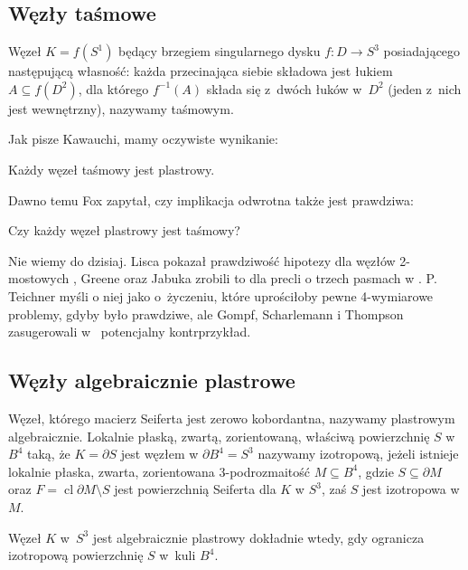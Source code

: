\subsection{Węzły taśmowe}
\begin{definition}
    Węzeł $K = f(S^1)$ będący brzegiem singularnego dysku $f \colon D \to S^3$ posiadającego następującą własność: każda przecinająca siebie składowa jest łukiem $A \subseteq f(D^2)$, dla którego $f^{-1}(A)$ składa się z~dwóch łuków w~$D^2$ (jeden z~nich jest wewnętrzny), nazywamy taśmowym.
\end{definition}

Jak pisze Kawauchi, mamy oczywiste wynikanie:

\begin{proposition}
    Każdy węzeł taśmowy jest plastrowy.
\end{proposition}

Dawno temu Fox zapytał, czy implikacja odwrotna także jest prawdziwa:

\begin{conjecture}
    Czy każdy węzeł plastrowy jest taśmowy?
\end{conjecture}

Nie wiemy do dzisiaj.
Lisca pokazał prawdziwość hipotezy dla węzłów 2-mostowych \cite{lisca07}, Greene oraz Jabuka zrobili to dla precli o trzech pasmach w \cite{greene11}.
P. Teichner myśli o niej jako o~życzeniu, które uprościłoby pewne 4-wymiarowe problemy, gdyby było prawdziwe, ale Gompf, Scharlemann i Thompson zasugerowali w~\cite{gompf10} potencjalny kontrprzykład.

\subsection{Węzły algebraicznie plastrowe}
Węzeł, którego macierz Seiferta jest zerowo kobordantna, nazywamy plastrowym algebraicznie.
Lokalnie płaską, zwartą, zorientowaną, właściwą powierzchnię $S$ w $B^4$ taką, że $K = \partial S$ jest węzłem w $\partial B^4 = S^3$ nazywamy izotropową, jeżeli istnieje lokalnie płaska, zwarta, zorientowana 3-podrozmaitość $M \subseteq B^4$, gdzie $S \subseteq \partial M$ oraz $F = \operatorname{cl} \partial M \setminus S$ jest powierzchnią Seiferta dla $K$ w $S^3$, zaś $S$ jest izotropowa w $M$.

\begin{proposition}
    Węzeł $K$ w~$S^3$ jest algebraicznie plastrowy dokładnie wtedy, gdy ogranicza izotropową powierzchnię $S$ w~kuli $B^4$.
\end{proposition}

